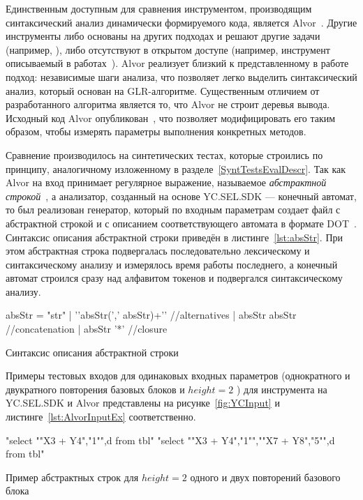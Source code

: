 Единственным доступным для сравнения инструментом, производящим синтаксический анализ динамически формируемого кода, является Alvor~\cite{Alvor1, Alvor2}. Другие инструменты либо основаны на других подходах и решают другие задачи (например, \cite{JSA,PHPSA}), либо отсутствуют в открытом доступе (например, инструмент описываемый в работах~\cite{LrAbstract1,LrAbstract2}). Alvor реализует  близкий к представленному в работе подход: независимые шаги анализа, что позволяет легко выделить синтаксический анализ, который основан на GLR-алгоритме. Существенным отличием от разработанного алгоритма является то, что Alvor не строит деревья вывода. Исходный код Alvor опубликован~\cite{AlvorUrl}, что позволяет модифицировать его таким образом, чтобы измерять параметры выполнения конкретных методов. 

Сравнение производилось на синтетических тестах, которые строились по принципу, аналогичному изложенному в разделе~\ref{SyntTestsEvalDescr}. Так как Alvor на вход принимает регулярное выражение, называемое \textit{абстрактной строкой}~\cite{Alvor2}, а анализатор, созданный на основе YC.SEL.SDK --- конечный автомат, то был реализован генератор, который по входным параметрам создает файл с абстрактной строкой и с описанием соответствующего автомата в формате DOT~\cite{DOT}. Синтаксис описания абстрактной строки приведён в листинге~\ref{lst:absStr}. При этом абстрактная строка подвергалась последовательно лексическому и синтаксическому анализу и измерялось время работы последнего, а конечный автомат строился сразу над алфавитом токенов и подвергался синтаксическому анализу.

\begin{listing}
    \begin{pyglist}[numbers=left,numbersep=5pt]
absStr = "str"
       | '{'absStr(',' absStr)+'}' //alternatives
       | absStr absStr             //concatenation
       | absStr '*'                //closure
\end{pyglist}
\caption{Синтаксис описания абстрактной строки}
\label{lst:absStr}
\end{listing}

 
Примеры тестовых входов для одинаковых входных параметров (однократного и двукратного повторения базовых блоков и $height=2$ ) для инструмента на YC.SEL.SDK и Alvor представлены на рисунке~\ref{fig:YCInput} и листинге~\ref{lst:AlvorInputEx}  соответственно. 

\begin{listing}
    \begin{pyglist}[numbers=left,numbersep=5pt]
"select "{"X3 + Y4","1"}",d from tbl"
"select "{"X3 + Y4","1"}","{"X7 + Y8","5"}",d from tbl"
\end{pyglist}
\caption{Пример абстрактных строк для $height=2$ одного и двух повторений базового блока}
\label{lst:AlvorInputEx}
\end{listing}

